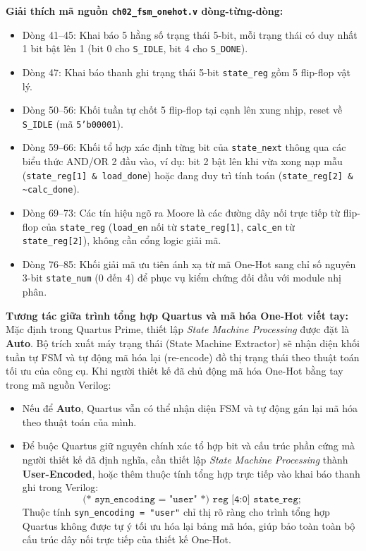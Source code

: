 \textbf{Giải thích mã nguồn \texttt{ch02\_fsm\_onehot.v} dòng-từng-dòng:}
\begin{itemize}[leftmargin=1.5em, itemsep=2pt]
    \item Dòng 41--45: Khai báo 5 hằng số trạng thái 5-bit, mỗi trạng thái có duy nhất 1 bit bật lên 1 (bit 0 cho \texttt{S\_IDLE}, bit 4 cho \texttt{S\_DONE}).
    \item Dòng 47: Khai báo thanh ghi trạng thái 5-bit \texttt{state\_reg} gồm 5 flip-flop vật lý.
    \item Dòng 50--56: Khối tuần tự chốt 5 flip-flop tại cạnh lên xung nhịp, reset về \texttt{S\_IDLE} (mã \texttt{5'b00001}).
    \item Dòng 59--66: Khối tổ hợp xác định từng bit của \texttt{state\_next} thông qua các biểu thức AND/OR 2 đầu vào, ví dụ: bit 2 bật lên khi vừa xong nạp mẫu (\texttt{state\_reg[1] \& load\_done}) hoặc đang duy trì tính toán (\texttt{state\_reg[2] \& \~{}calc\_done}).
    \item Dòng 69--73: Các tín hiệu ngõ ra Moore là các đường dây nối trực tiếp từ flip-flop của \texttt{state\_reg} (\texttt{load\_en} nối từ \texttt{state\_reg[1]}, \texttt{calc\_en} từ \texttt{state\_reg[2]}), không cần cổng logic giải mã.
    \item Dòng 76--85: Khối giải mã ưu tiên ánh xạ từ mã One-Hot sang chỉ số nguyên 3-bit \texttt{state\_num} (0 đến 4) để phục vụ kiểm chứng đối đầu với module nhị phân.
\end{itemize}

\textbf{Tương tác giữa trình tổng hợp Quartus và mã hóa One-Hot viết tay:}
Mặc định trong Quartus Prime, thiết lập \emph{State Machine Processing} được đặt là \textbf{Auto}. Bộ trích xuất máy trạng thái (State Machine Extractor) sẽ nhận diện khối tuần tự FSM và tự động mã hóa lại (re-encode) đồ thị trạng thái theo thuật toán tối ưu của công cụ.
Khi người thiết kế đã chủ động mã hóa One-Hot bằng tay trong mã nguồn Verilog:
\begin{itemize}[leftmargin=1.5em, itemsep=2pt]
    \item Nếu để \textbf{Auto}, Quartus vẫn có thể nhận diện FSM và tự động gán lại mã hóa theo thuật toán của mình.
    \item Để buộc Quartus giữ nguyên chính xác tổ hợp bit và cấu trúc phần cứng mà người thiết kế đã định nghĩa, cần thiết lập \emph{State Machine Processing} thành \textbf{User-Encoded}, hoặc thêm thuộc tính tổng hợp trực tiếp vào khai báo thanh ghi trong Verilog:
    \begin{equation}
    \texttt{(* syn\_encoding = "user" *) reg [4:0] state\_reg;}
    \end{equation}
    Thuộc tính \texttt{syn\_encoding = "user"} chỉ thị rõ ràng cho trình tổng hợp Quartus không được tự ý tối ưu hóa lại bảng mã hóa, giúp bảo toàn toàn bộ cấu trúc dây nối trực tiếp của thiết kế One-Hot.
\end{itemize}

